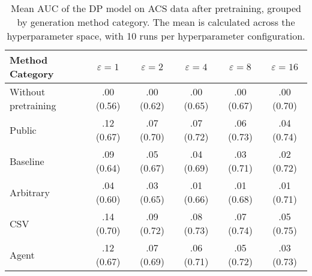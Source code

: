 \begin{table}[h!]
    \centering
    \caption{Mean AUC of the DP model on ACS data after pretraining, grouped by generation method category. The mean is calculated across the hyperparameter space, with 10 runs per hyperparameter configuration.}
    \label{tab:epsilon_comparison}
    \begin{tabular}{lccccc}
    \toprule
    Method Category & $\varepsilon=1$ & $\varepsilon=2$ & $\varepsilon=4$ & $\varepsilon=8$ & $\varepsilon=16$ \\
    \midrule
    Without pretraining & .00 {\small (0.56)} & .00 {\small (0.62)} & .00 {\small (0.65)} & .00 {\small (0.67)} & .00 {\small (0.70)} \\
    \arrayrulecolor{black!50!}\midrule
    Public & \cellcolor{silver!30}.12 {\small (0.67)} & \cellcolor{silver!30}.07 {\small (0.70)} & \cellcolor{silver!30}.07 {\small (0.72)} & \cellcolor{silver!30}.06 {\small (0.73)} & \cellcolor{silver!30}.04 {\small (0.74)} \\
    \arrayrulecolor{black!50!}\midrule
    Baseline & .09 {\small (0.64)} & .05 {\small (0.67)} & .04 {\small (0.69)} & .03 {\small (0.71)} & .02 {\small (0.72)} \\
    \arrayrulecolor{black!50!}\midrule
    Arbitrary & .04 {\small (0.60)} & .03 {\small (0.65)} & .01 {\small (0.66)} & .01 {\small (0.68)} & .01 {\small (0.71)} \\
    \arrayrulecolor{black!50!}\midrule
    CSV & \cellcolor{gold!30}.14 {\small (0.70)} & \cellcolor{gold!30}.09 {\small (0.72)} & \cellcolor{gold!30}.08 {\small (0.73)} & \cellcolor{gold!30}.07 {\small (0.74)} & \cellcolor{gold!30}.05 {\small (0.75)} \\
    Agent & \cellcolor{bronze!30}.12 {\small (0.67)} & \cellcolor{bronze!30}.07 {\small (0.69)} & \cellcolor{bronze!30}.06 {\small (0.71)} & \cellcolor{bronze!30}.05 {\small (0.72)} & \cellcolor{bronze!30}.03 {\small (0.73)} \\
    \bottomrule
    \end{tabular}
\end{table}